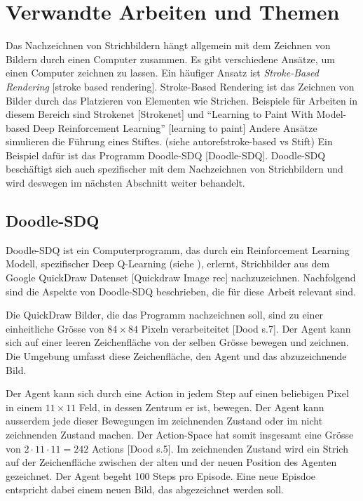 \section{Verwandte Arbeiten und Themen}\label{chap:t_ver}
Das Nachzeichnen von Strichbildern hängt allgemein mit dem Zeichnen von Bildern
durch einen Computer zusammen. Es gibt verschiedene Ansätze, um einen Computer
zeichnen zu lassen. Ein häufiger Ansatz ist \emph{Stroke-Based Rendering}
[stroke based rendering]. Stroke-Based Rendering ist das Zeichnen von Bilder
durch das Platzieren von Elementen wie Strichen. Beispiele für Arbeiten in
diesem Bereich sind Strokenet [Strokenet] und ``Learning to Paint With
Model-based Deep Reinforcement Learning'' [learning to paint] Andere Ansätze
simulieren die Führung eines Stiftes. (siehe autoref{stroke-based vs Stift}) Ein
Beispiel dafür ist das Programm Doodle-SDQ [Doodle-SDQ]. Doodle-SDQ beschäftigt
sich auch spezifischer mit dem Nachzeichnen von Strichbildern und wird deswegen
im nächsten Abschnitt weiter behandelt.


\subsection{Doodle-SDQ}\label{sub:t_ver_dood}
Doodle-SDQ ist ein Computerprogramm, das durch ein Reinforcement Learning
Modell, spezifischer Deep Q-Learning (siehe ), erlernt,
Strichbilder aus dem Google QuickDraw Datenset [Quickdraw Image rec]
nachzuzeichnen. Nachfolgend sind die Aspekte von Doodle-SDQ beschrieben, die für
diese Arbeit relevant sind.

Die QuickDraw Bilder, die das Programm nachzeichnen soll, sind zu einer
einheitliche Grösse von $84\times84$ Pixeln verarbeiteitet [Dood s.7]. Der Agent
kann sich auf einer leeren Zeichenfläche von der selben Grösse bewegen und
zeichnen. Die Umgebung umfasst diese Zeichenfläche, den Agent und das
abzuzeichnende Bild.

Der Agent kann sich durch eine Action in jedem Step auf einen beliebigen Pixel
in einem $11\times11$ Feld, in dessen Zentrum er ist, bewegen. Der Agent kann
ausserdem jede dieser Bewegungen im zeichnenden Zustand oder im nicht
zeichnenden Zustand machen. Der Action-Space hat somit insgesamt eine Grösse von
$2\cdot11\cdot11 = 242$ Actions [Dood s.5]. Im zeichnenden Zustand wird ein Strich auf der
Zeichenfläche zwischen der alten und der neuen Position des Agenten gezeichnet.
Der Agent begeht 100 Steps pro Episode. Eine neue Episdoe entspricht dabei einem
neuen Bild, das abgezeichnet werden soll.

